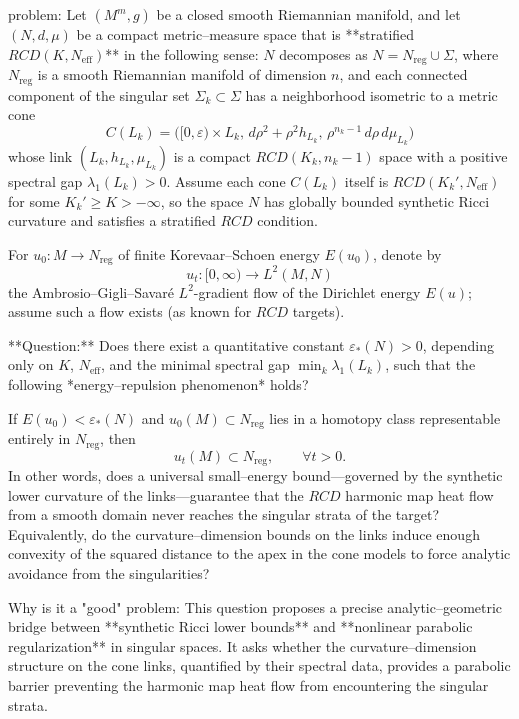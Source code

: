 problem:  
Let \( (M^m,g) \) be a closed smooth Riemannian manifold, and let \( (N,d,\mu) \) be a compact metric–measure space that is **stratified \(RCD(K,N_{\mathrm{eff}})\)** in the following sense: \(N\) decomposes as \(N = N_{\mathrm{reg}} \cup \Sigma\), where \(N_{\mathrm{reg}}\) is a smooth Riemannian manifold of dimension \(n\), and each connected component of the singular set \( \Sigma_k \subset \Sigma \) has a neighborhood isometric to a metric cone  
\[
C(L_k) = \bigl([0,\varepsilon)\times L_k,\, d\rho^2 + \rho^2 h_{L_k},\, \rho^{n_k-1}\,d\rho \, d\mu_{L_k}\bigr)
\]
whose link \( (L_k,h_{L_k},\mu_{L_k}) \) is a compact \(RCD(K_k,n_k-1)\) space with a positive spectral gap \( \lambda_1(L_k) > 0 \).  
Assume each cone \(C(L_k)\) itself is \(RCD(K_k',N_{\mathrm{eff}})\) for some \(K_k'\ge K > -\infty\), so the space \(N\) has globally bounded synthetic Ricci curvature and satisfies a stratified \(RCD\) condition.

For \(u_0 : M \to N_{\mathrm{reg}}\) of finite Korevaar–Schoen energy \(E(u_0)\), denote by  
\[
u_t : [0,\infty)\to L^2(M,N)
\]
the Ambrosio–Gigli–Savaré \(L^2\)-gradient flow of the Dirichlet energy \(E(u)\); assume such a flow exists (as known for \(RCD\) targets).

**Question:**  
Does there exist a quantitative constant \( \varepsilon_*(N) > 0 \), depending only on \(K\), \(N_{\mathrm{eff}}\), and the minimal spectral gap \(\min_k \lambda_1(L_k)\), such that the following *energy–repulsion phenomenon* holds?

If \(E(u_0) < \varepsilon_*(N)\) and \(u_0(M)\subset N_{\mathrm{reg}}\) lies in a homotopy class representable entirely in \(N_{\mathrm{reg}}\), then  
\[
u_t(M) \subset N_{\mathrm{reg}},\qquad \forall t>0.
\]
In other words, does a universal small–energy bound—governed by the synthetic lower curvature of the links—guarantee that the \(RCD\) harmonic map heat flow from a smooth domain never reaches the singular strata of the target?  
Equivalently, do the curvature–dimension bounds on the links induce enough convexity of the squared distance to the apex in the cone models to force analytic avoidance from the singularities?

Why is it a "good" problem:  
This question proposes a precise analytic–geometric bridge between **synthetic Ricci lower bounds** and **nonlinear parabolic regularization** in singular spaces.  It asks whether the curvature–dimension structure on the cone links, quantified by their spectral data, provides a parabolic barrier preventing the harmonic map heat flow from encountering the singular strata.  

